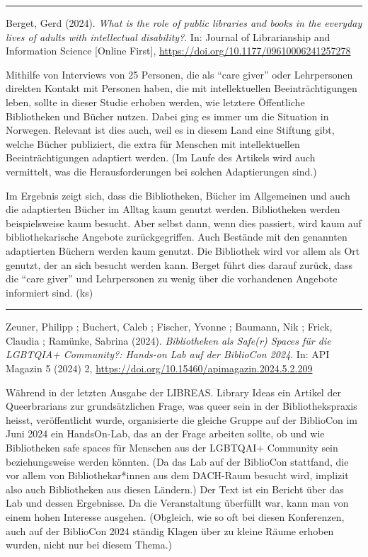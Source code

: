 \documentclass[a4paper,
fontsize=11pt,
oneside,
numbers=noperiodatend,
parskip=half-,
bibliography=totoc,
final
]{scrartcl}
\begin{document}
\begin{center}\rule{0.5\linewidth}{0.5pt}\end{center}

Berget, Gerd (2024). \emph{What is the role of public libraries and
books in the everyday lives of adults with intellectual disability?}.
In: Journal of Librarianship and Information Science {[}Online First{]},
\url{https://doi.org/10.1177/09610006241257278}

Mithilfe von Interviews von 25 Personen, die als \enquote{care giver}
oder Lehrpersonen direkten Kontakt mit Personen haben, die mit
intellektuellen Beeinträchtigungen leben, sollte in dieser Studie
erhoben werden, wie letztere Öffentliche Bibliotheken und Bücher nutzen.
Dabei ging es immer um die Situation in Norwegen. Relevant ist dies
auch, weil es in diesem Land eine Stiftung gibt, welche Bücher
publiziert, die extra für Menschen mit intellektuellen
Beeinträchtigungen adaptiert werden. (Im Laufe des Artikels wird auch
vermittelt, was die Herausforderungen bei solchen Adaptierungen sind.)

Im Ergebnis zeigt sich, dass die Bibliotheken, Bücher im Allgemeinen und
auch die adaptierten Bücher im Alltag kaum genutzt werden. Bibliotheken
werden beispielsweise kaum besucht. Aber selbst dann, wenn dies
passiert, wird kaum auf bibliothekarische Angebote zurückgegriffen. Auch
Bestände mit den genannten adaptierten Büchern werden kaum genutzt. Die
Bibliothek wird vor allem als Ort genutzt, der an sich besucht werden
kann. Berget führt dies darauf zurück, dass die \enquote{care giver} und
Lehrpersonen zu wenig über die vorhandenen Angebote informiert sind.
(ks)

\begin{center}\rule{0.5\linewidth}{0.5pt}\end{center}

Zeuner, Philipp ; Buchert, Caleb ; Fischer, Yvonne ; Baumann, Nik ;
Frick, Claudia ; Ramünke, Sabrina (2024). \emph{Bibliotheken als Safe(r)
Spaces für die LGBTQIA+ Community?: Hands-on Lab auf der BiblioCon
2024}. In: API Magazin 5 (2024) 2,
\url{https://doi.org/10.15460/apimagazin.2024.5.2.209}

Während in der letzten Ausgabe der LIBREAS. Library Ideas ein Artikel
der Queerbrarians zur grundsätzlichen Frage, was queer sein in der
Bibliothekspraxis heisst, veröffentlicht wurde, organisierte die gleiche
Gruppe auf der BiblioCon im Juni 2024 ein HandsOn-Lab, das an der Frage
arbeiten sollte, ob und wie Bibliotheken safe spaces für Menschen aus
der LGBTQAI+ Community sein beziehungsweise werden könnten. (Da das Lab
auf der BiblioCon stattfand, die vor allem von Bibliothekar*innen aus
dem DACH-Raum besucht wird, implizit also auch Bibliotheken aus diesen
Ländern.) Der Text ist ein Bericht über das Lab und dessen Ergebnisse.
Da die Veranstaltung überfüllt war, kann man von einem hohen Interesse
ausgehen. (Obgleich, wie so oft bei diesen Konferenzen, auch auf der
BiblioCon 2024 ständig Klagen über zu kleine Räume erhoben wurden, nicht
nur bei diesem Thema.)
\end{document}
